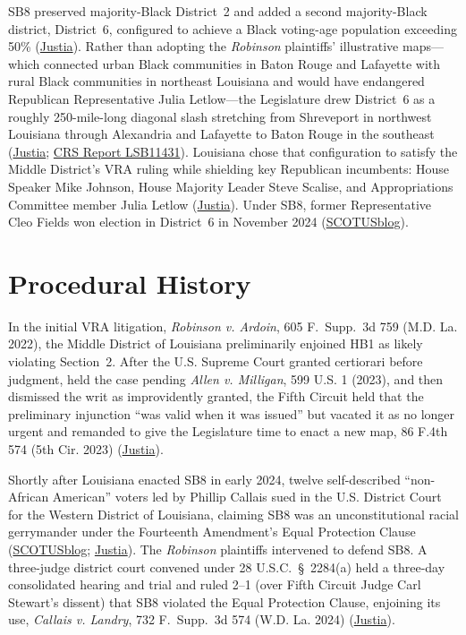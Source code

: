 \documentclass[12pt]{article}
\begin{document}
SB8 preserved majority-Black District~2 and added a second majority-Black district, District~6, configured to achieve a Black voting-age population exceeding 50\% (\href{https://supreme.justia.com/cases/federal/us/608/24-109/}{Justia}). Rather than adopting the \textit{Robinson} plaintiffs' illustrative maps---which connected urban Black communities in Baton Rouge and Lafayette with rural Black communities in northeast Louisiana and would have endangered Republican Representative Julia Letlow---the Legislature drew District~6 as a roughly 250-mile-long diagonal slash stretching from Shreveport in northwest Louisiana through Alexandria and Lafayette to Baton Rouge in the southeast (\href{https://supreme.justia.com/cases/federal/us/608/24-109/}{Justia}; \href{https://www.everycrsreport.com/reports/LSB11431.html}{CRS Report LSB11431}). Louisiana chose that configuration to satisfy the Middle District's VRA ruling while shielding key Republican incumbents: House Speaker Mike Johnson, House Majority Leader Steve Scalise, and Appropriations Committee member Julia Letlow (\href{https://supreme.justia.com/cases/federal/us/608/24-109/}{Justia}). Under SB8, former Representative Cleo Fields won election in District~6 in November 2024 (\href{https://www.scotusblog.com/2026/04/in-major-voting-rights-act-case-supreme-court-strikes-down-redistricting-map-challenged-as-racia/}{SCOTUSblog}).

\section{Procedural History}

In the initial VRA litigation, \textit{Robinson v. Ardoin}, 605 F.~Supp.~3d 759 (M.D. La. 2022), the Middle District of Louisiana preliminarily enjoined HB1 as likely violating Section~2. After the U.S. Supreme Court granted certiorari before judgment, held the case pending \textit{Allen v. Milligan}, 599 U.S. 1 (2023), and then dismissed the writ as improvidently granted, the Fifth Circuit held that the preliminary injunction ``was valid when it was issued'' but vacated it as no longer urgent and remanded to give the Legislature time to enact a new map, 86 F.4th 574 (5th Cir. 2023) (\href{https://supreme.justia.com/cases/federal/us/608/24-109/}{Justia}).

Shortly after Louisiana enacted SB8 in early 2024, twelve self-described ``non-African American'' voters led by Phillip Callais sued in the U.S. District Court for the Western District of Louisiana, claiming SB8 was an unconstitutional racial gerrymander under the Fourteenth Amendment's Equal Protection Clause (\href{https://www.scotusblog.com/2026/04/in-major-voting-rights-act-case-supreme-court-strikes-down-redistricting-map-challenged-as-racia/}{SCOTUSblog}; \href{https://supreme.justia.com/cases/federal/us/608/24-109/}{Justia}). The \textit{Robinson} plaintiffs intervened to defend SB8. A three-judge district court convened under 28 U.S.C.~\S~2284(a) held a three-day consolidated hearing and trial and ruled 2--1 (over Fifth Circuit Judge Carl Stewart's dissent) that SB8 violated the Equal Protection Clause, enjoining its use, \textit{Callais v. Landry}, 732 F.~Supp.~3d 574 (W.D. La. 2024) (\href{https://supreme.justia.com/cases/federal/us/608/24-109/}{Justia}).
\end{document}

